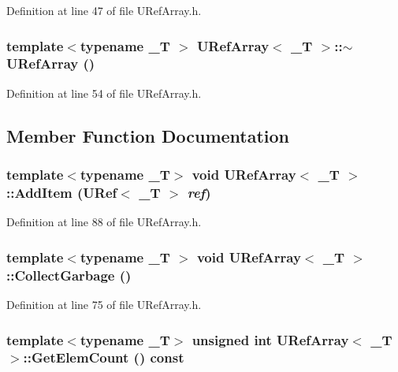 Definition at line 47 of file URefArray.h.\hypertarget{class_u_ref_array_86c8cb2dce43147ed9e25e81993fab12}{
\subsubsection[{$\sim$URefArray}]{\setlength{\rightskip}{0pt plus 5cm}template$<$typename \_\-T $>$ {\bf URefArray}$<$ \_\-T $>$::$\sim${\bf URefArray} ()}}
\label{class_u_ref_array_86c8cb2dce43147ed9e25e81993fab12}




Definition at line 54 of file URefArray.h.

\subsection{Member Function Documentation}
\hypertarget{class_u_ref_array_21c0e5f6c72001bba3a83e91db39874e}{
\subsubsection[{AddItem}]{\setlength{\rightskip}{0pt plus 5cm}template$<$typename \_\-T$>$ void {\bf URefArray}$<$ \_\-T $>$::AddItem ({\bf URef}$<$ \_\-T $>$ {\em ref})}}
\label{class_u_ref_array_21c0e5f6c72001bba3a83e91db39874e}




Definition at line 88 of file URefArray.h.\hypertarget{class_u_ref_array_d45fce6eff4609721d8d66007ce01613}{
\subsubsection[{CollectGarbage}]{\setlength{\rightskip}{0pt plus 5cm}template$<$typename \_\-T $>$ void {\bf URefArray}$<$ \_\-T $>$::CollectGarbage ()}}
\label{class_u_ref_array_d45fce6eff4609721d8d66007ce01613}




Definition at line 75 of file URefArray.h.\hypertarget{class_u_ref_array_8de496e80b8cd87ec57271cebcf7e1b0}{
\subsubsection[{GetElemCount}]{\setlength{\rightskip}{0pt plus 5cm}template$<$typename \_\-T$>$ unsigned int {\bf URefArray}$<$ \_\-T $>$::GetElemCount () const}}
\label{class_u_ref_array_8de496e80b8cd87ec57271cebcf7e1b0}




